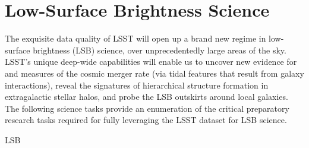 \section{Low-Surface Brightness Science}\label{sec:tasks:lsb}  
{\justify
The exquisite data quality of LSST will open up a brand new regime in
low-surface brightness (LSB) science, over unprecedentedly large areas of the sky. LSST's unique deep-wide capabilities will enable us to uncover new evidence for and measures of the cosmic merger rate (via tidal features that result from galaxy interactions), reveal the signatures of hierarchical structure formation in extragalactic stellar halos, and probe the LSB outskirts around local galaxies. The following science tasks provide an enumeration of the critical preparatory research tasks required for fully leveraging the LSST dataset for LSB science.  

\begin{tasklist}{LSB}

\end{tasklist}}
